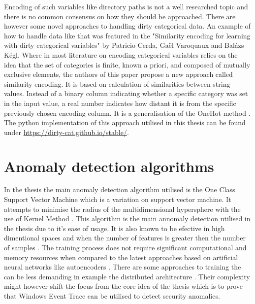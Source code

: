 \documentclass[a4paper,twoside,12pt]{book}
\begin{document}
Encoding of such variables like directory paths is not a well researched topic and there is no 
common consensus on how they should be approached. There are however some novel approaches to 
handling dirty categorical data. An example of how to handle data like that was featured in the 
"Similarity encoding for learning with dirty categorical variables" by Patricio Cerda,  Ga{\"e}l 
Varoquaux and Bal{\'a}zs K{\'e}gl. Where in most literature on encoding categorical variables 
relies on the idea that the set of categories is finite, known a priori, and composed of mutually 
exclusive elements, the authors of this paper propose a new approach called similarity encoding. 
It is based on calculation of similarities between string values. Instead of a binary column 
indicating whether a specific category was set in the input value, a real number indicates how 
distant it is from the specific previously chosen encoding column. It is a generalisation of the 
OneHot method \cite{bib:dirtycat}. The python implementation of this approach utilised in this thesis 
can be found under \url{https://dirty-cat.github.io/stable/}.


\section{Anomaly detection algorithms}
In the thesis the main anomaly detection algorithm utilised is the One Class Support 
Vector Machine which is a variation on support vector machine. It attempts to minimise 
the radius of the multidimensional hypersphere with the use of Kernel Method \cite{bib:ocsvm}. 
This algorithm is the main annomaly detection utilised in the thesis due to it's ease of
usage. It is also known to be efective in high dimentional spaces and when 
the number of features is greater then the number of samples \cite{bib:svms}. The training process 
does not require significant computational and memory resources when compared to the latest
approaches based on artificial neural networks like autoencoders \cite{bib:autoencoder}. There are
some approaches to training the can be less demanding in example the distributed architecture
\cite{bib:autoencoderDist}. Their complexity might however shift the focus from the core idea 
of the thesis which is to prove that Windows Event Trace can be utilised to detect security
anomalies. 
\end{document}
